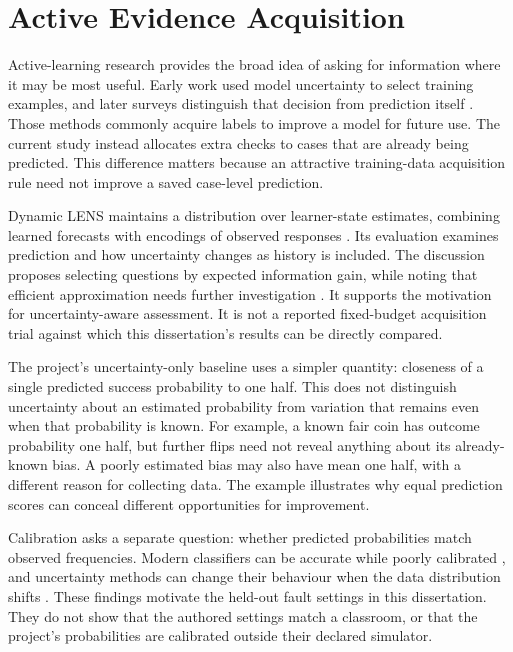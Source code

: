 \section{Active Evidence Acquisition}

Active-learning research provides the broad idea of asking for information where it may be most useful. Early work used model
uncertainty to select training examples, and later surveys distinguish that decision from prediction itself
\parencite{lewis1994sequential,cohn1996active,settles2009active}. Those methods commonly acquire labels to improve a model
for future use. The current study instead allocates extra checks to cases that are already being predicted. This difference
matters because an attractive training-data acquisition rule need not improve a saved case-level prediction.

Dynamic LENS maintains a distribution over learner-state estimates, combining learned forecasts with encodings of observed
responses \parencite[Section 2]{christie2024dynamiclens}. Its evaluation examines prediction and how uncertainty changes as
history is included. The discussion proposes selecting questions by expected information gain, while noting that efficient
approximation needs further investigation \parencite[Sections 3--4]{christie2024dynamiclens}. It supports the motivation for
uncertainty-aware assessment. It is not a reported fixed-budget acquisition trial against which this dissertation's results
can be directly compared.

The project's uncertainty-only baseline uses a simpler quantity: closeness of a single predicted success probability to
one half. This does not distinguish uncertainty about an estimated probability from variation that remains even when that
probability is known. For example, a known fair coin has outcome probability one half, but further flips need not reveal
anything about its already-known bias. A poorly estimated bias may also have mean one half, with a different reason for
collecting data. The example illustrates why equal prediction scores can conceal different opportunities for improvement.

Calibration asks a separate question: whether predicted probabilities match observed frequencies. Modern classifiers can be
accurate while poorly calibrated \parencite{guo2017calibration}, and uncertainty methods can change their behaviour when the
data distribution shifts \parencite{ovadia2019uncertainty}. These findings motivate the held-out fault settings in this
dissertation. They do not show that the authored settings match a classroom, or that the project's probabilities are calibrated
outside their declared simulator.

